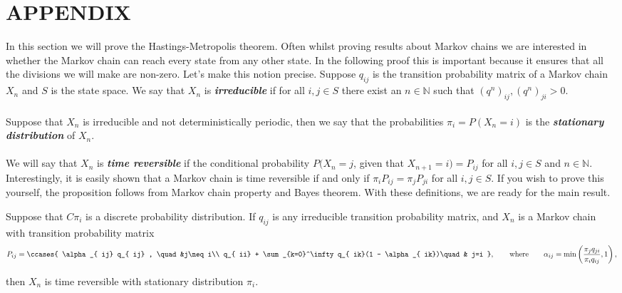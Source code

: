 \documentclass[11pt,english,a4paper]{article}
\begin{document}
\section*{\uppercase{Appendix}}
In this section we will prove the Hastings-Metropolis theorem. Often whilst proving results about Markov chains we are interested in whether the Markov chain can reach every state from any other state. In the following proof this is important because it ensures that all the divisions we will make are non-zero. Let's make this notion precise. Suppose $q_{  ij}$ is the transition probability matrix of a Markov chain $X_n$ and $S$ is the state space. We say that $X_n$ is \textit{\textbf{irreducible}} if for all $i,j \in S$ there exist an $n \in \mathbb{N}$ such that $(q^n)_{  ij}, (q^n)_{  ji} > 0$.\\
\\
Suppose that $X_n$ is irreducible and not deterministically periodic, then we say that the probabilities $\pi_i = P(X_n = i)$ is the \textit{\textbf{stationary distribution}} of $X_n$.\\
\\
We will say that $X_n$ is \textit{\textbf{time reversible}} if the conditional probability $P(X_{n} = j$, given that $X_{n+1} = i) = P_{  ij}$ for all $i,j \in S$ and $n \in \mathbb{N}$. Interestingly, it is easily shown that a Markov chain is time reversible if and only if $\pi_i P_{  ij} = \pi_j P_{  ji}$ for all $i,j \in S$. If you wish to prove this yourself, the proposition follows from Markov chain property and Bayes theorem. With these definitions, we are ready for the main result.
\begin{theorem}
Suppose that $C\pi_i$ is a discrete probability distribution. If $q_{ij}$ is any irreducible transition probability matrix, and $X_n$ is a Markov chain with transition probability matrix 
\begin{equation}
P_{ij} = \ccases {
\alpha_{  ij} q_{  ij} , \quad &j\neq i\\
q_{  ii} + \sum_{k=0}^\infty q_{  ik}(1 - \alpha_{  ik})\quad & j=i
},\qquad \text{where} \qquad \alpha_{  ij} = \min \left( \frac{\pi_j q_{  ji}}{\pi_i q_{  ij}} , 1\right), \label{eq:metropolis}
\end{equation}
\end{theorem}
then $X_n$ is time reversible with stationary distribution $\pi_i$.
\end{document}
